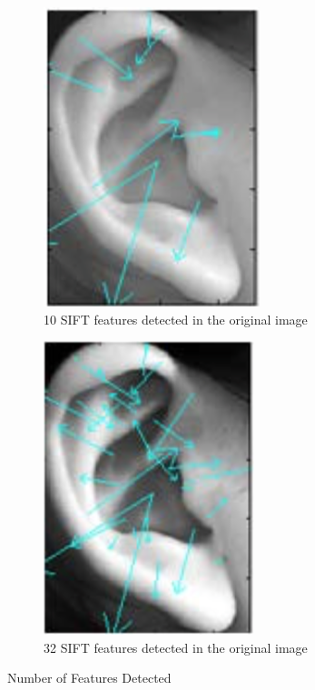 \begin{figure}
\centering
\begin{subfigure}{.5\textwidth}
  \centering
  \includegraphics[width=.4\linewidth]{Figures/Figure7}
  \caption{10 SIFT features detected in the original image}
  \label{fig:sub5}
\end{subfigure}%
\begin{subfigure}{.5\textwidth}
  \centering
  \includegraphics[width=.4\linewidth]{Figures/Figure8}
  \caption{32 SIFT features detected in the original image}
  \label{fig:sub6}
\end{subfigure}
\caption{ Number of Features Detected}
\label{fig:test}
\end{figure}




